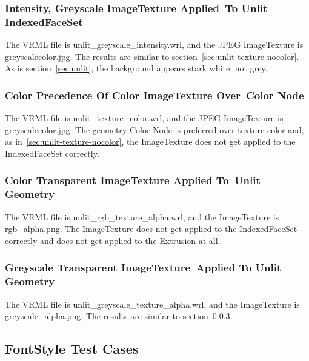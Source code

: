 \documentclass[12pt,letterpaper]{article}
\newcommand{\AppIa}{Intensity, Greyscale ImageTexture Applied~}
\newcommand{\AppIb}{To Unlit IndexedFaceSet}
\newcommand{\AppJa}{Color Precedence Of Color ImageTexture Over~}
\newcommand{\AppJb}{Color Node}
\newcommand{\AppKa}{Color Transparent ImageTexture Applied To~}
\newcommand{\AppKb}{Unlit Geometry}
\newcommand{\AppLa}{Greyscale Transparent ImageTexture~}
\newcommand{\AppLb}{Applied To Unlit Geometry}
\begin{document}
\subsubsection{\AppIa\AppIb}
The VRML file is unlit\_greyscale\_intensity.wrl, and the JPEG ImageTexture
is greyscalecolor.jpg.\newline
The results are similar to section~\ref{sec:unlit-texture-nocolor}.
As is section~\ref{sec:unlit}, the background appears stark white, not grey.

\subsubsection{\AppJa\AppJb}
The VRML file is unlit\_texture\_color.wrl, and the JPEG ImageTexture
is greyscalecolor.jpg.\newline
The geometry Color Node is preferred over texture color and, as
in~\ref{sec:unlit-texture-nocolor}, the ImageTexture does not get
applied to the IndexedFaceSet correctly.

\subsubsection{\AppKa\AppKb}
\label{sec:unlit-rgb-texture}
The VRML file is unlit\_rgb\_texture\_alpha.wrl, and the ImageTexture
is rgb\_alpha.png.\newline
The ImageTexture does not get applied to the IndexedFaceSet correctly
and does not get applied to the Extrusion at all.

\subsubsection{\AppLa\AppLb}
The VRML file is unlit\_greyscale\_texture\_alpha.wrl, and the ImageTexture
is greyscale\_alpha.png.\newline
The results are similar to section~\ref{sec:unlit-rgb-texture}.

\subsection{FontStyle Test Cases}
\end{document}
